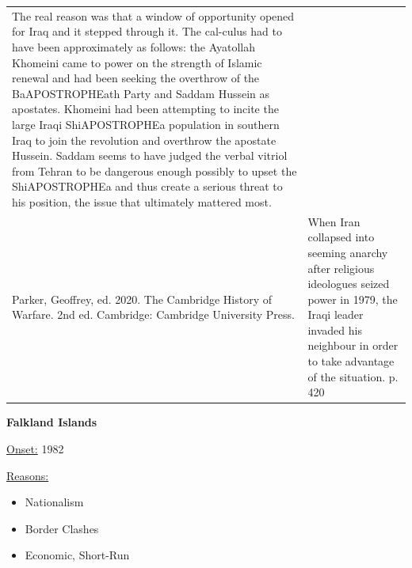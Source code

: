 {\begin{longtable}{p{}p{}}
The real reason was that a window of opportunity opened for Iraq and it stepped through it. The cal-culus had to have been approximately as follows: the Ayatollah Khomeini came to power on the strength of Islamic renewal and had been seeking the overthrow of the BaAPOSTROPHEath Party and Saddam Hussein as apostates. Khomeini had been attempting to incite the large Iraqi ShiAPOSTROPHEa population in southern Iraq to join the revolution and overthrow the apostate Hussein. Saddam seems to have judged the verbal vitriol from Tehran to be dangerous enough possibly to upset the ShiAPOSTROPHEa and thus create a serious threat to his position, the issue that ultimately mattered most.
\\
Parker, Geoffrey, ed. 2020. The Cambridge History of Warfare. 2nd ed. Cambridge: Cambridge University Press. & When Iran collapsed into seeming anarchy after religious ideologues seized power in 1979, the Iraqi leader invaded his neighbour in order to take advantage of the situation. p. 420
\\
\end{longtable}}
\clearpage
         \textbf{Falkland Islands} 

          \underline{Onset:} 1982         

\underline{Reasons:}
\begin{itemize}
\item Nationalism
\item Border Clashes
\item Economic, Short-Run
\end{itemize}

